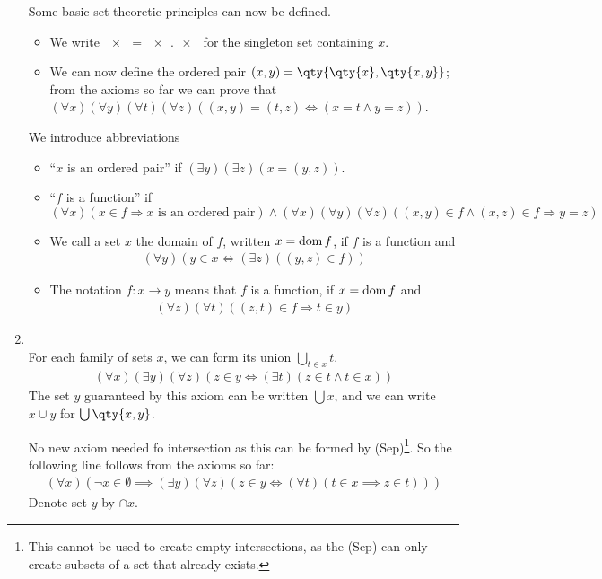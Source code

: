 \begin{enumerate}
    Some basic set-theoretic principles can now be defined.
    \begin{itemize}
        \item We write $\qty{x} = \qty{x, x}$ for the singleton set containing $x$.
        \item We can now define the ordered pair $(x, y) = \qty{\qty{x}, \qty{x, y}}$; from the axioms so far we can prove that $(\forall x) (\forall y) (\forall t) (\forall z) ((x, y) = (t, z) \iff (x = t \wedge y = z))$.
    \end{itemize}

    We introduce abbreviations
    \begin{itemize}
        \item ``$x$ is an ordered pair'' if $(\exists y)(\exists z)(x = (y,z))$.
        \item ``$f$ is a function'' if $(\forall x)(x \in f \Rightarrow x \text{ is an ordered pair}) \wedge (\forall x)(\forall y)(\forall z)((x,y) \in f \wedge (x,z) \in f \Rightarrow y = z)$
        \item We call a set $x$ the domain of $f$, written $x = \operatorname{dom} f$, if $f$ is a function and
        \begin{align*}
            (\forall y)(y \in x \Leftrightarrow (\exists z)((y,z) \in f))
        \end{align*}
        \item The notation $f \colon x \to y$ means that $f$ is a function, if $x = \operatorname{dom} f$ and
        \begin{align*}
            (\forall z)(\forall t)((z, t) \in f \Rightarrow t \in y)
        \end{align*}
    \end{itemize}

    \item {} \\
    For each family of sets $x$, we can form its union $\bigcup_{t \in x} t$.
    \begin{align*}
        (\forall x)(\exists y)(\forall z)(z \in y \Leftrightarrow (\exists t)(z \in t \wedge t \in x))
    \end{align*}
    The set $y$ guaranteed by this axiom can be written $\bigcup x$, and we can write $x \cup y$ for $\bigcup \qty{x, y}$.

    \begin{remark}
        No new axiom needed fo intersection as this can be formed by (Sep)\footnote{This cannot be used to create empty intersections, as the (Sep) can only create subsets of a set that already exists.}.
        So the following line follows from the axioms so far:
        \begin{align*}
            (\forall x)(\neg x \in \emptyset \implies (\exists y)(\forall z)(z \in y \iff (\forall t)(t \in x \implies z \in t)))
        \end{align*}
        Denote set $y$ by $\cap x$.


\end{remark}
\end{enumerate}

